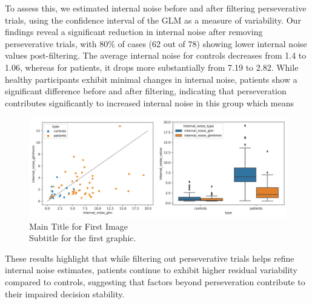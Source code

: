 To assess this, we estimated internal noise before and after filtering perseverative trials, using the confidence interval of the GLM as a measure of variability. Our findings reveal a significant reduction in internal noise after removing perseverative trials, with 80\% of cases (62 out of 78) showing lower internal noise values post-filtering. The average internal noise for controls decreases from 1.4 to 1.06, whereas for patients, it drops more substantially from 7.19 to 2.82. While healthy participants exhibit minimal changes in internal noise, patients show a significant difference before and after filtering, indicating that perseveration contributes significantly to increased internal noise in this group which means 
\begin{figure}[H]
    \centering
    \includegraphics[width=16cm]{MainLayout/Images/chapter7/internal_noise_comparison.png}
    \caption{Main Title for First Image \\ \small Subtitle for the first graphic.}
    \label{fig:internal_noise_comparison}
\end{figure}

These results highlight that while filtering out perseverative trials helps refine internal noise estimates, patients continue to exhibit higher residual variability compared to controls, suggesting that factors beyond perseveration contribute to their impaired decision stability.


